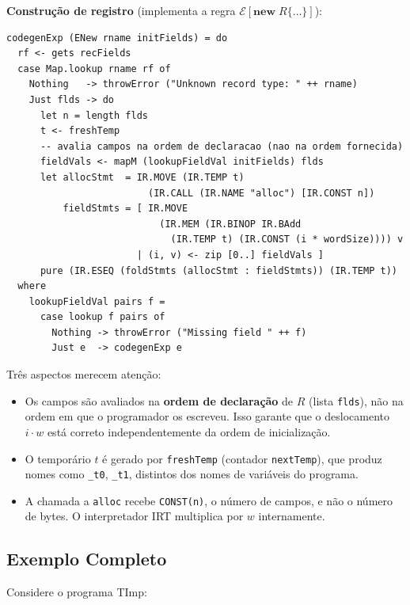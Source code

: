 \textbf{Construção de registro} (implementa a regra
$\mathcal{E}[\mathbf{new}\;R\{\ldots\}]$):

\begin{verbatim}
codegenExp (ENew rname initFields) = do
  rf <- gets recFields
  case Map.lookup rname rf of
    Nothing   -> throwError ("Unknown record type: " ++ rname)
    Just flds -> do
      let n = length flds
      t <- freshTemp
      -- avalia campos na ordem de declaracao (nao na ordem fornecida)
      fieldVals <- mapM (lookupFieldVal initFields) flds
      let allocStmt  = IR.MOVE (IR.TEMP t)
                         (IR.CALL (IR.NAME "alloc") [IR.CONST n])
          fieldStmts = [ IR.MOVE
                           (IR.MEM (IR.BINOP IR.BAdd
                             (IR.TEMP t) (IR.CONST (i * wordSize)))) v
                       | (i, v) <- zip [0..] fieldVals ]
      pure (IR.ESEQ (foldStmts (allocStmt : fieldStmts)) (IR.TEMP t))
  where
    lookupFieldVal pairs f =
      case lookup f pairs of
        Nothing -> throwError ("Missing field " ++ f)
        Just e  -> codegenExp e
\end{verbatim}

Três aspectos merecem atenção:

\begin{itemize}
  \item Os campos são avaliados na \textbf{ordem de declaração} de \(R\)
    (lista \texttt{flds}), não na ordem em que o programador os escreveu.
    Isso garante que o deslocamento \(i \cdot w\) está correto
    independentemente da ordem de inicialização.
  \item O temporário \(t\) é gerado por \texttt{freshTemp} (contador
    \texttt{nextTemp}), que produz nomes como \texttt{\_t0}, \texttt{\_t1},
    distintos dos nomes de variáveis do programa.
  \item A chamada a \texttt{alloc} recebe \texttt{CONST(n)}, o número
    de campos, e não o número de bytes. O interpretador IRT multiplica
    por \(w\) internamente.
\end{itemize}

\subsection{Exemplo Completo}
\label{sec:ir-timp-example}

Considere o programa TImp:

